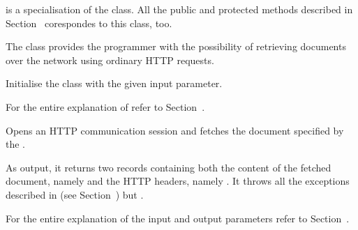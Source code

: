 \documentclass{ozdoc}
\begin{document}
 is a specialisation of the  class. All the public and protected methods described in Section~ corespondes to this class, too.

The  class provides the programmer with the possibility of retrieving documents over the network using ordinary  HTTP requests. \mozartEMPTY
 \mozartEMPTY
\begin{mozartDESCRIPTION}
\mozartENTRYHASCODE
\begin{mozartSYNOPSIS}
\begin{mozartCODEDISPLAY}\mozartFACETEXT{)}\end{mozartCODEDISPLAY}
\end{mozartSYNOPSIS}
\mozartITEM Initialise the class with the given  input parameter.

  \mozartEMPTY
For the entire explanation of  refer to Section~. \mozartEMPTY
{}\mozartENTRYHASCODE
\begin{mozartSYNOPSIS}
\begin{mozartCODEDISPLAY}\mozartFACETEXT{\mozartSPACE{}}\mozartFACETEXT{\mozartSPACE{}}\mozartFACETEXT{)}\end{mozartCODEDISPLAY}
\end{mozartSYNOPSIS}
\mozartITEM Opens an HTTP communication session and fetches the document specified by the .

As output, it returns two records containing both the content of the fetched document, namely  and the HTTP headers, namely . It throws all the exceptions described in (see Section~) but .

For the entire explanation of the input and output parameters refer to Section~. \mozartEMPTY
\end{mozartDESCRIPTION}
\end{document}
